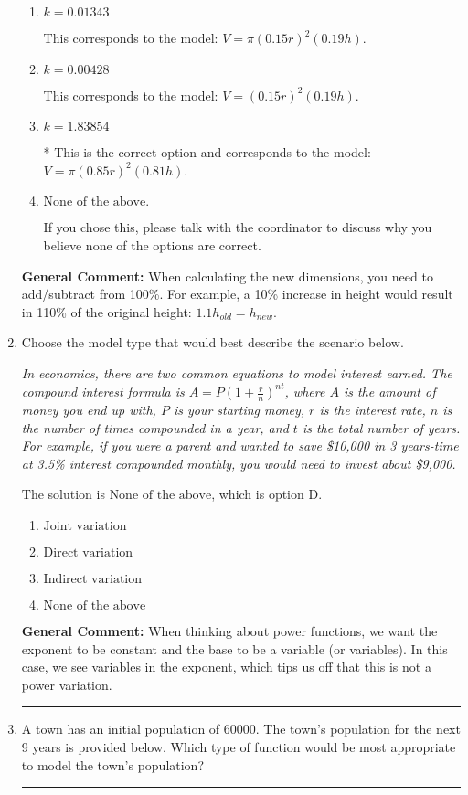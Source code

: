 \documentclass{extbook}[14pt]
\newcommand{\litem}[1]{\item #1

\rule{\textwidth}{0.4pt}}
\begin{document}
\begin{enumerate}
{\begin{enumerate}[label=\Alph*.]
This corresponds to the model: $V = (0.85 r)^2 (0.81 h)$.
\item \( k = 0.01343 \)

This corresponds to the model: $V = \pi (0.15 r)^2 (0.19 h)$.
\item \( k = 0.00428 \)

This corresponds to the model: $V = (0.15 r)^2 (0.19 h)$.
\item \( k = 1.83854 \)

* This is the correct option and corresponds to the model: $V = \pi (0.85 r)^2 (0.81 h)$.
\item \( \text{None of the above.} \)

If you chose this, please talk with the coordinator to discuss why you believe none of the options are correct.
\end{enumerate}

\textbf{General Comment:} When calculating the new dimensions, you need to add/subtract from 100\%. For example, a 10\% increase in height would result in 110\% of the original height: $1.1h_{old} = h_{new}$.
}
\litem{
Choose the model type that would best describe the scenario below.

\begin{center}
    \textit{ In economics, there are two common equations to model interest earned. The compound interest formula is $A = P (1 + \frac{r}{n})^{nt}$, where $A$ is the amount of money you end up with, $P$ is your starting money, $r$ is the interest rate, $n$ is the number of times compounded in a year, and $t$ is the total number of years. For example, if you were a parent and wanted to save \$10,000 in 3 years-time at 3.5\% interest compounded monthly, you would need to invest about \$9,000. }
\end{center}
The solution is \( \text{None of the above} \), which is option D.\begin{enumerate}[label=\Alph*.]
\item \( \text{Joint variation} \)


\item \( \text{Direct variation} \)


\item \( \text{Indirect variation} \)


\item \( \text{None of the above} \)


\end{enumerate}

\textbf{General Comment:} When thinking about power functions, we want the exponent to be constant and the base to be a variable (or variables). In this case, we see variables in the exponent, which tips us off that this is not a power variation.
}
\litem{
A town has an initial population of 60000. The town's population for the next 9 years is provided below. Which type of function would be most appropriate to model the town's population?


}
\end{enumerate}
\end{document}

